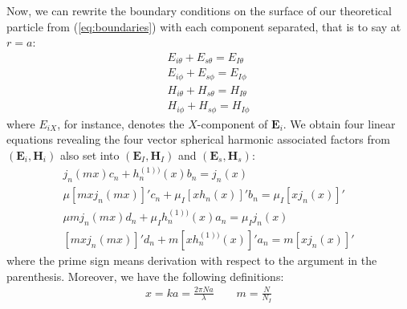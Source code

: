 \documentclass{article}
\numberwithin{equation}{section}
\begin{document}
Now, we can rewrite the boundary conditions on the surface of our theoretical particle from (\ref{eq:boundaries}) with each component separated, that is to say at $r=a$:
\begin{equation}\label{eq:boundary_comp}
\begin{aligned}
E_{i\theta} + E_{s\theta} = E_{I\theta}\\
E_{i\phi} + E_{s\phi} = E_{I\phi}\\
H_{i\theta} + H_{s\theta} = H_{I\theta}\\
H_{i\phi} + H_{s\phi} = H_{I\phi}
\end{aligned}
\end{equation}
where $E_{iX}$, for instance, denotes the $X$-component of $\textbf{E}_{i}$. We obtain four linear equations revealing the four vector spherical harmonic associated factors from $(\textbf{E}_{i}, \textbf{H}_{i})$ also set into $(\textbf{E}_{I}, \textbf{H}_{I})$ and $(\textbf{E}_{s}, \textbf{H}_{s})$:
\begin{equation}\label{eq:coeff_linear}
\begin{aligned}
j_{n}(mx)c_{n} + h^{(1))}_{n}(x)b_{n} = j_{n}(x) \\
\mu[mxj_{n}(mx)]'c_{n} + \mu_{I}[xh_{n}(x)]'b_{n} = \mu_{I}[xj_{n}(x)]' \\
\mu mj_{n}(mx)d_{n} + \mu_{I}h^{(1))}_{n}(x)a_{n} = \mu_{I}j_{n}(x) \\
[mxj_{n}(mx)]'d_{n}+m[xh^{(1))}_{n}(x)]'a_{n} = m[xj_{n}(x)]'
\end{aligned}
\end{equation}
where the prime sign means derivation with respect to the argument in the parenthesis. Moreover, we have the following definitions:
\begin{equation}\label{eq:def_x_m}
\begin{aligned}
x = ka = \frac{2\pi Na}{\lambda} \qquad m = \frac{N}{N_{I}}
\end{aligned}
\end{equation}
\end{document}
